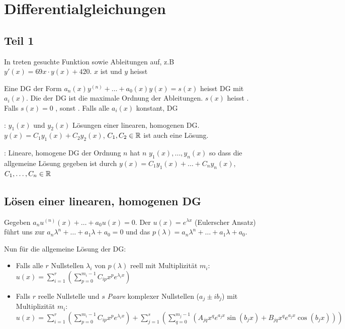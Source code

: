 \section{Differentialgleichungen}

\subsection{Teil 1}

\Def In  treten gesuchte Funktion sowie Ableitungen auf,
z.B $y'(x) = 69x \cdot y(x) + 420$. $x$ ist  und $y$ heisst

\Def Eine DG der Form
$a_n(x)y^{(n)} + \ldots + a_0(x)y(x) = s(x)$
heisst  DG mit  $a_i(x)$. Die  der DG ist
die maximale Ordnung der Ableitungen. $s(x)$ heisst . Falls $s(x) = 0$
, sonst .
Falls alle $a_i(x)$ konstant, DG 

\Satz {}: $y_1(x)$ und $y_2(x)$ Lösungen einer linearen, homogenen DG.
$y(x) = C_1 y_1(x) + C_2 y_2(x)$, $C_1, C_2 \in \mathbb{R}$ ist auch eine Lösung.

\Satz {}: Lineare, homogene DG der Ordnung $n$ hat $n$
 $y_1(x), \ldots, y_n(x)$ so dass die allgemeine Lösung gegeben ist durch
$y(x) = C_1 y_1(x) + \ldots + C_n y_n(x)$, $C_1, \ldots, C_n \in \mathbb{R}$

\subsection{Lösen einer linearen, homogenen DG}

Gegeben $a_n u^{(n)}(x) + \ldots + a_0 u(x) = 0$. Der  $u(x) = e^{\lambda x}$
(Eulerscher Ansatz) führt uns zur 
$a_n \lambda^n + \ldots + a_1 \lambda + a_0 = 0$ und das 
$p(\lambda) = a_n \lambda^n + \ldots + a_1 \lambda + a_0$.

Nun für die allgemeine Lösung der DG:
\vspace{-0.6em}
\begin{itemize}
    \item Falls alle $r$ Nullstellen $\lambda_i$ von $p(\lambda)$ reell mit Multiplizität $m_i$:
    $u(x) = \sum_{i=1}^{r} \left(\sum_{p=0}^{m_i-1} C_{ip}x^pe^{\lambda_i x}\right)$
    \item Falls $r$ reelle Nullstelle und $s$ \textit{Paare} komplexer Nullstellen ($a_j \pm ib_j$)
    mit Multiplizität $m_i$:
    $u(x) = \sum_{i=1}^{r}\left(\sum_{p=0}^{m_i - 1}C_{ip} x^p e^{\lambda_i x}\right) + \sum_{j=1}^{s} \left(\sum_{q=0}^{m_j-1}(A_{jq} x^q e^{a_j x} \sin(b_j x) + B_{jq} x^q e^{a_j x} \cos(b_j x))\right)$
\end{itemize}

